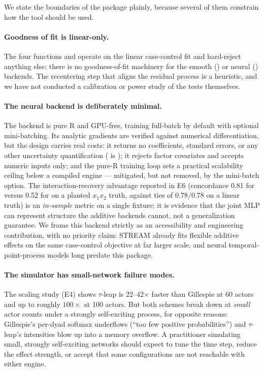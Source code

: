 We state the boundaries of the package plainly, because several of them
constrain how the tool should be used.

\paragraph{Goodness of fit is linear-only.} The four  functions and
 operate on the linear case-control fit and hard-reject
anything else; there is no goodness-of-fit machinery for the smooth ()
or neural () backends. The recentering step that aligns the residual
process is a heuristic, and we have not conducted a calibration or power study of
the tests themselves.

\paragraph{The neural backend is deliberately minimal.} The  backend is
pure R and GPU-free, training full-batch by default with optional
mini-batching. Its analytic gradients are verified against
numerical differentiation, but the design carries real costs: it returns no
coefficients, standard errors, or any other uncertainty quantification
( is ); it rejects factor covariates and accepts numeric
inputs only; and the pure-R training loop sets a practical scalability ceiling below a
compiled engine --- mitigated, but not removed, by the mini-batch option. The interaction-recovery
advantage reported in E6 (concordance 0.81 for  versus 0.52 for
 on a planted $x_1 x_2$ truth, against ties of 0.78/0.78 on a linear
truth) is an \emph{in-sample} metric on a single fixture; it is evidence that the
joint MLP can represent structure the additive backends cannot, not a
generalization guarantee. We frame this backend strictly as an accessibility and
engineering contribution, with no priority claim: STREAM
\citep{filippimazzola2024} already fits flexible additive effects on the same
case-control objective at far larger scale, and neural temporal-point-process
models \citep{du2016,mei2017} long predate this package.

\paragraph{The simulator has small-network failure modes.} The scaling study (E4)
shows $\tau$-leap is 22--42$\times$ faster than Gillespie at 60 actors and up to
roughly $100\times$ at 100 actors. But both schemes break down at \emph{small}
actor counts under a strongly self-exciting process, for opposite reasons:
Gillespie's per-dyad softmax underflows (``too few positive probabilities'') and
$\tau$-leap's intensities blow up into a memory overflow. A practitioner
simulating small, strongly self-exciting networks should expect to tune the time
step, reduce the effect strength, or accept that some configurations are not
reachable with either engine.

